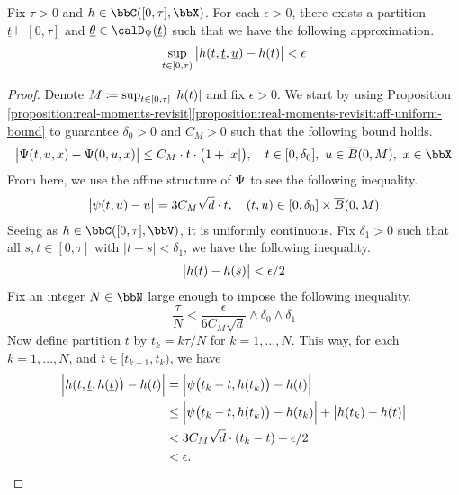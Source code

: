 \begin{lemma}
  \label{lemma:span-affPart-dense}
  Fix $\tau > 0$ and $\twistFunc \in \cpathSpace{[0,\tau]}{\stateSpace}$.
  For each $\epsilon > 0$, there exists a partition $\underline t \vdash [0,\tau]$ and $\underline\twistVar \in \momentSpace(\underline t)$ such that we have the following approximation.
  \begin{equation*}
    \sup_{t \in [0,\tau)} \big| h(t, \underline t, \underline{u}) - h(t) \big| < \epsilon
  \end{equation*}
\end{lemma}

\begin{proof}
  \label{proof:lemma:span-affPart-dense}
  Denote $M \coloneqq \sup_{t\in[0,\tau]} |h(t)|$ and fix $\epsilon > 0$.
  We start by using Proposition \ref{proposition:real-moments-revisit}\ref{proposition:real-moments-revisit:aff-uniform-bound} to guarantee $\delta_0 > 0$ and $C_M > 0$ such that the following bound holds.
  \begin{equation*}
    \big|\aff(t,\momentVar,\stateVar)-\aff(0,\momentVar,\stateVar)\big| \leq C_M \cdot t \cdot \big(1 + |\stateVar|\big), \quad  t \in [0,\delta_0], ~ \momentVar \in  \closedBall{0}{M}, ~\stateVar \in \stateSpace
  \end{equation*}
  From here, we use the affine structure of $\Psi$ to see the following inequality.
  \begin{equation*}
    \big|\psi(t,u)-u\big| = 3C_M\sqrt d \cdot t, \quad (t,u) \in [0,\delta_0]\times\overline B(0,M)
  \end{equation*}
  Seeing as $\twistFunc \in \cpathSpace{[0,\tau]}{\vecSpace}$, it is uniformly continuous.
  Fix $\delta_1 > 0$ such that all $s, t \in [0,\tau]$ with $|t-s| < \delta_1$, we have the following inequality.
  \begin{equation*}
    \big|h(t) - h(s)\big| < \epsilon/2
  \end{equation*}
  Fix an integer $N \in \bbN$ large enough to impose the following inequality.
  \begin{equation*}
    \frac{\tau}{N} < \frac{\epsilon}{6C_M \sqrt d} \wedge \delta_0 \wedge \delta_1
  \end{equation*}
  Now define partition $\underline t$ by $t_k = k\tau/N$ for $k = 1, \ldots, N$.
  This way, for each $k = 1, \ldots, N$, and $t \in [t_{k-1},t_k)$, we have
  \begin{align*}
    \Big| h(t, \underline t, h(\underline t)\big) - h(t) \Big| 
    &= \Big| \psi\big(t_k - t, h(t_k)\big) - h(t) \Big| \\
    &\leq \Big| \psi\big(t_k - t, h(t_k)\big) - h(t_k) \Big| + \big| h(t_k) - h(t) \big| \\
    &< 3 C_M \sqrt d \cdot (t_k-t) + \epsilon/2 \\
    &< \epsilon.
  \end{align*}
\end{proof}


